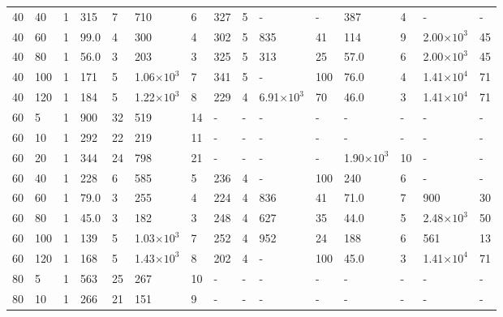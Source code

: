 \begin{table}[!ht]
\begin{center}
{\begin{tabular}{|l|l|l||l|l|l|l|l|l||l|l|l|l|l|l|}
40	&	40	&	1	&	315	&	7	&	710	&	6	&	327	&	5	&	-	&	-	&	387	&	4	&	-	&	-	\\



40	&	60	&	1	&	99.0	&	4	&	300	&	4	&	302	&	5	&	835	&	41	&	114	&	9	&	2.00$\times10^3$	&	45	\\



40	&	80	&	1	&	56.0	&	3	&	203	&	3	&	325	&	5	&	313	&	25	&	57.0	&	6	&	2.00$\times10^3$	&	45	\\

40	&	100	&	1	&	171	&	5	&	1.06$\times10^3$	&	7	&	341	&	5	&	-	&	100	&	76.0	&	4	&	1.41$\times10^4$	&	71	\\

40	&	120	&	1	&	184	&	5	&	1.22$\times10^3$	&	8	&	229	&	4	&	6.91$\times10^3$	&	70	&	46.0	&	3	&	1.41$\times10^4$	&	71	\\


60	&	5	&	1	&	900	&	32	&	519	&	14	&	-	&	-	&	-	&	-	&	-	&	-	&	-	&	-	\\
60	&	10	&	1	&	292	&	22	&	219	&	11	&	-	&	-	&	-	&	-	&	-	&	-	&	-	&	-	\\

60	&	20	&	1	&	344	&	24	&	798	&	21	&	-	&	-	&	-	&	-	&	1.90$\times10^3$	&	10	&	-	&	-	\\



60	&	40	&	1	&	228	&	6	&	585	&	5	&	236	&	4	&	-	&	100	&	240	&	6	&	-	&	-	\\



60	&	60	&	1	&	79.0	&	3	&	255	&	4	&	224	&	4	&	836	&	41	&	71.0	&	7	&	900	&	30	\\



60	&	80	&	1	&	45.0	&	3	&	182	&	3	&	248	&	4	&	627	&	35	&	44.0	&	5	&	2.48$\times10^3$	&	50	\\

60	&	100	&	1	&	139	&	5	&	1.03$\times10^3$	&	7	&	252	&	4	&	952	&	24	&	188	&	6	&	561	&	13	\\

60	&	120	&	1	&	168	&	5	&	1.43$\times10^3$	&	8	&	202	&	4	&	-	&	100	&	45.0	&	3	&	1.41$\times10^4$	&	71	\\



80	&	5	&	1	&	563	&	25	&	267	&	10	&	-	&	-	&	-	&	-	&	-	&	-	&	-	&	-	\\
80	&	10	&	1	&	266	&	21	&	151	&	9	&	-	&	-	&	-	&	-	&	-	&	-	&	-	&	-	\\


\end{tabular}}
\end{center}
\end{table}
